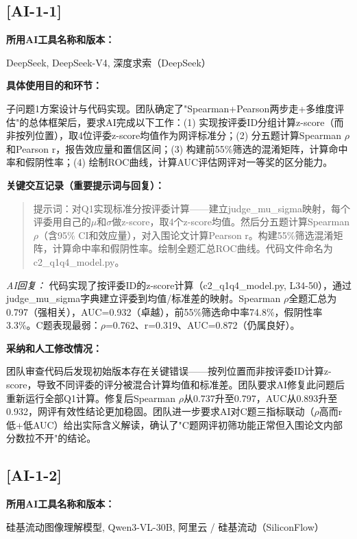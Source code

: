 \documentclass[12pt,a4paper]{ctexart}
\begin{document}
\subsection*{[AI-1-1]}

\textbf{所用AI工具名称和版本：}\par
DeepSeek, DeepSeek-V4, 深度求索（DeepSeek）

\textbf{具体使用目的和环节：}\par
子问题1方案设计与代码实现。团队确定了"Spearman+Pearson两步走+多维度评估"的总体框架后，要求AI完成以下工作：(1) 实现按评委ID分组计算z-score（而非按列位置），取4位评委z-score均值作为网评标准分；(2) 分五题计算Spearman $\rho$和Pearson r，报告效应量和置信区间；(3) 构建前55\%筛选的混淆矩阵，计算命中率和假阴性率；(4) 绘制ROC曲线，计算AUC评估网评对一等奖的区分能力。

\textbf{关键交互记录（重要提示词与回复）：}\par

\begin{quote}
提示词：对Q1实现标准分按评委计算——建立judge\_mu\_sigma映射，每个评委用自己的$\mu$和$\sigma$做z-score，取4个z-score均值。然后分五题计算Spearman $\rho$（含95\% CI和效应量），对入围论文计算Pearson r。构建55\%筛选混淆矩阵，计算命中率和假阴性率。绘制全题汇总ROC曲线。代码文件命名为c2\_q1q4\_model.py。
\end{quote}

\textit{AI回复：} 代码实现了按评委ID的z-score计算（c2\_q1q4\_model.py, L34-50），通过judge\_mu\_sigma字典建立评委到均值/标准差的映射。Spearman $\rho$全题汇总为0.797（强相关），AUC=0.932（卓越），前55\%筛选命中率74.8\%，假阴性率3.3\%。C题表现最弱：$\rho$=0.762、r=0.319、AUC=0.872（仍属良好）。

\textbf{采纳和人工修改情况：}\par
团队审查代码后发现初始版本存在关键错误——按列位置而非按评委ID计算z-score，导致不同评委的评分被混合计算均值和标准差。团队要求AI修复此问题后重新运行全部Q1计算。修复后Spearman $\rho$从0.737升至0.797，AUC从0.893升至0.932，网评有效性结论更加稳固。团队进一步要求AI对C题三指标联动（$\rho$高而r低+低AUC）给出实际含义解读，确认了"C题网评初筛功能正常但入围论文内部分数拉不开"的结论。

\subsection*{[AI-1-2]}

\textbf{所用AI工具名称和版本：}\par
硅基流动图像理解模型, Qwen3-VL-30B, 阿里云 / 硅基流动（SiliconFlow）
\end{document}
